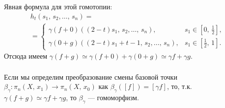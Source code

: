\documentclass[c]{beamer}
\begin{document}
\begin{frame}
\frametitle{\insertsection}
\framesubtitle{\insertsubsection}
Явная формула для этой гомотопии:
\begin{multline*}
	h_t(s_1,\,s_2,\ldots,\,s_n)=\\= \begin{cases}
		\gamma(f+0)\left( (2-t)s_1,\,s_2,\ldots,\,s_n
		\right), & s_1 \in \left[ 0,\,\frac{1}{2} \right], \\
		\gamma(0+g)\left( (2-t)s_1+ t-1,\,s_2,\ldots
	,\,s_n\right), & s_1 \in \left[ \frac{1}{2},\,1 \right]. 
	\end{cases}
\end{multline*} 
Отсюда имеем $\gamma(f+g)\simeq \gamma(f+0)+\gamma(0+g)
 \simeq \gamma f +\gamma g$.
\end{frame}
\begin{frame}
\frametitle{\insertsection}
\framesubtitle{\insertsubsection}
Если мы определим преобразование смены базовой точки
$\beta_\gamma\colon \pi_n(X,\,x_1)\to \pi_n(X,\,x_0)$ как
$\beta_\gamma \left( [f] \right) =[\gamma f]$, то, т.\:к.
$\gamma(f+g)\simeq \gamma f +\gamma g$, то $\beta_\gamma$ ---
гомоморфизм.
\end{frame}
\end{document}
